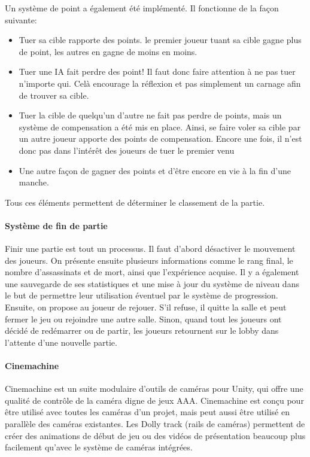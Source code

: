 			Un système de point a également été implémenté. Il fonctionne de la façon suivante:
			\begin{itemize}
				\item Tuer sa cible rapporte des points. le premier joueur tuant sa cible gagne plus de point, les autres en gagne de moins en moins.
				\item Tuer une IA fait perdre des point! Il faut donc faire attention à ne pas tuer n'importe qui. Celà encourage la réflexion et pas simplement un carnage afin de trouver sa cible.
				\item Tuer la cible de quelqu'un d'autre ne fait pas perdre de points, mais un système de compensation a été mis en place. Ainsi, se faire voler sa cible par un autre joueur apporte des points de compensation. Encore une fois, il n'est donc pas dans l'intérêt 
				des joueurs de tuer le premier venu
				\item Une autre façon de gagner des points et d'être encore en vie à la fin d'une manche.
			\end{itemize}
			Tous ces éléments permettent de déterminer le classement de la partie.
	

		\paragraph{Système de fin de partie}

			Finir une partie est tout un processus. Il faut d'abord désactiver le mouvement des joueurs.
			On présente ensuite plusieurs informations comme le rang final, le nombre d'assassinats
			et de mort, ainsi que l'expérience acquise. Il y a également une sauvegarde de ses statistiques et une mise à jour du système
			de niveau dans le but de permettre leur utilisation éventuel par le système de progression.
			Ensuite, on propose au joueur de rejouer. S'il refuse, il quitte la salle et peut fermer le jeu ou rejoindre une autre salle.
			Sinon, quand tout les joueurs ont décidé de redémarrer ou de partir, les joueurs retournent 
			sur le lobby dans l'attente d'une nouvelle partie.


		\paragraph{Cinemachine}

			Cinemachine est un suite modulaire d'outils de caméras pour Unity, qui offre 
			une qualité de contrôle de la caméra digne de jeux AAA. Cinemachine est conçu pour être utilisé 
			avec toutes les caméras d'un projet, mais peut aussi être utilisé en parallèle des caméras existantes. 
			Les Dolly track (rails de caméras) permettent de créer des animations de début de jeu ou 
			des vidéos de présentation beaucoup plus facilement qu'avec le système de caméras intégrées. 

